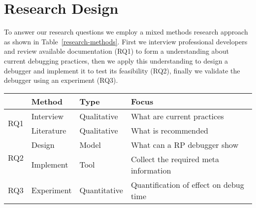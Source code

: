 \section{Research Design}
To answer our research questions we employ a mixed methods research approach as shown in Table~\ref{research-methods}.
First we interview professional developers and review available documentation (RQ1) to form a understanding about current debugging practices,
then we apply this understanding to design a debugger and implement it to test its feasibility (RQ2), 
finally we validate the debugger using an experiment (RQ3).

\begin{table*}[t]
\centering
\caption{Research Methods used in the study}
\label{research-methods}
\begin{tabular}{llll}
\hline
\textbf{}            & \textbf{Method} & \textbf{Type} & \textbf{Focus}                               \\ \hline
\multirow{2}{*}{RQ1} & Interview       & Qualitative   & What are current practices                   \\ \cline{2-4} 
                     & Literature      & Qualitative   & What is recommended                          \\ \hline
\multirow{2}{*}{RQ2} & Design          & Model         & What can a RP debugger show                  \\ \cline{2-4} 
                     & Implement       & Tool          & Collect the required meta information        \\ \hline
RQ3                  & Experiment      & Quantitative  & Quantification of effect on debug time       \\ \hline
\end{tabular}
\end{table*}

\iffalse
\todo{
qualitive data
quantitive
design, implemented, tested with real developers
buzz words: mixed methods, grounded theory
}
\fi